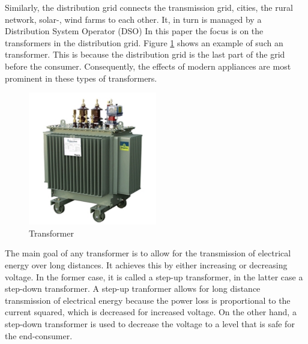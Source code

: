 Similarly, the distribution grid connects the transmission grid, cities, the rural network, solar-, wind farms to each other. It, in turn is managed by a Distribution System Operator (DSO)
In this paper the focus is on the transformers in the distribution grid. Figure \ref{fig:transformer} shows an example of such an transformer. This is because the distribution grid is the last part of the grid before the consumer. 
Consequently, the effects of modern appliances are most prominent in these types of transformers.
\begin{figure}[H]
    \centering
    \includegraphics[width=0.5\textwidth]{img/transformer.png}
    \caption{Transformer \cite{dGebouwd2021}}
    \label{fig:transformer}
\end{figure}
The main goal of any transformer is to allow for the transmission of electrical energy over long distances. 
It achieves this by either increasing or decreasing voltage. In the former case, it is called a step-up transformer, in the latter case a step-down transformer.
A step-up tranformer allows for long distance transmission of electrical energy because the power loss is proportional to the current squared, which is decreased for increased voltage.
On the other hand, a step-down transformer is used to decrease the voltage to a level that is safe for the end-consumer.

